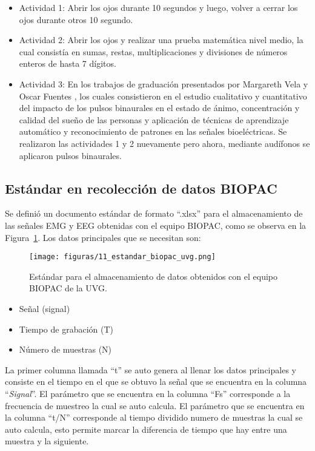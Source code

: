 \begin{itemize}    
    \item Actividad 1:
    Abrir los ojos durante 10 segundos y luego, volver a cerrar los ojos durante otros 10 segundo.   
    \item Actividad 2:
    Abrir los ojos y realizar una prueba matemática nivel medio, la cual consistía en sumas, restas, multiplicaciones y divisiones de números enteros de hasta 7 dígitos.
    \item Actividad 3:
    En los trabajos de graduación presentados por Margareth Vela \cite{magy_2023} y Oscar Fuentes \cite{oscar_2023}, los cuales consistieron en el estudio cualitativo y cuantitativo del impacto de los pulsos binaurales en el estado de ánimo, concentración y calidad del sueño de las personas y aplicación de técnicas de aprendizaje automático y reconocimiento de patrones en las señales bioeléctricas. Se realizaron las actividades 1 y 2 nuevamente pero ahora, mediante audífonos se aplicaron pulsos binaurales.
\end{itemize}

\subsection{Estándar en recolección de datos BIOPAC}
Se definió un documento estándar de formato ``.xlsx'' para el almacenamiento de las señales EMG y EEG obtenidas con el equipo BIOPAC,  como se observa en la Figura~\ref{fig:Estandar_bipoac_uvg}. Los datos principales que se necesitan son:

\begin{figure}[H]
    \centering
    \texttt{[image: figuras/11\_estandar\_biopac\_uvg.png]}
    \caption{Estándar para el almacenamiento de datos obtenidos con el equipo BIOPAC de la UVG.}
    \label{fig:Estandar_bipoac_uvg}
\end{figure}

\begin{itemize}
    \item Señal (signal)
    \item Tiempo de grabación (T)  
    \item Número de muestras (N)
\end{itemize}

La primer columna llamada ``t'' se auto genera al llenar los datos principales y consiste en el tiempo en el que se obtuvo la señal que se encuentra en la columna ``\textit{Signal}''. 
El parámetro que se encuentra en la columna ``Fs'' corresponde a la frecuencia de muestreo la cual se auto calcula.
El parámetro que se encuentra en la columna ``t/N'' corresponde al tiempo dividido numero de muestras la cual se auto calcula, esto permite marcar la diferencia de tiempo que hay entre una muestra y la siguiente.

